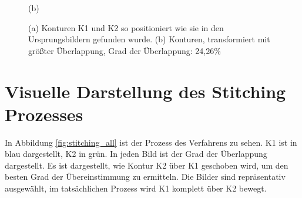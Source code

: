 \begin{figure}[h]
\begin{minipage}{0.49\textwidth}
        \caption*{(b)}
    \end{minipage}\hfill
    \caption{(a) Konturen K1 und K2 so positioniert wie sie in den
    Ursprungsbildern gefunden wurde.
    (b) Konturen, transformiert mit größter Überlappung, 
        Grad der Überlappung: 24,26\%}
        \label{fig:k1_and_k2}
\end{figure}

\section{Visuelle Darstellung des Stitching Prozesses}

In Abbildung \ref{fig:stitching_all} ist der Prozess des Verfahrens zu sehen.
K1 ist in blau dargestellt, K2 in grün.
In jeden Bild ist der Grad der Überlappung dargestellt. Es ist dargestellt, wie
Kontur K2 über K1 geschoben wird, um den besten Grad der Übereinstimmung zu ermitteln.
Die Bilder sind repräsentativ ausgewählt, im tatsächlichen Prozess wird K1 komplett 
über K2 bewegt.

